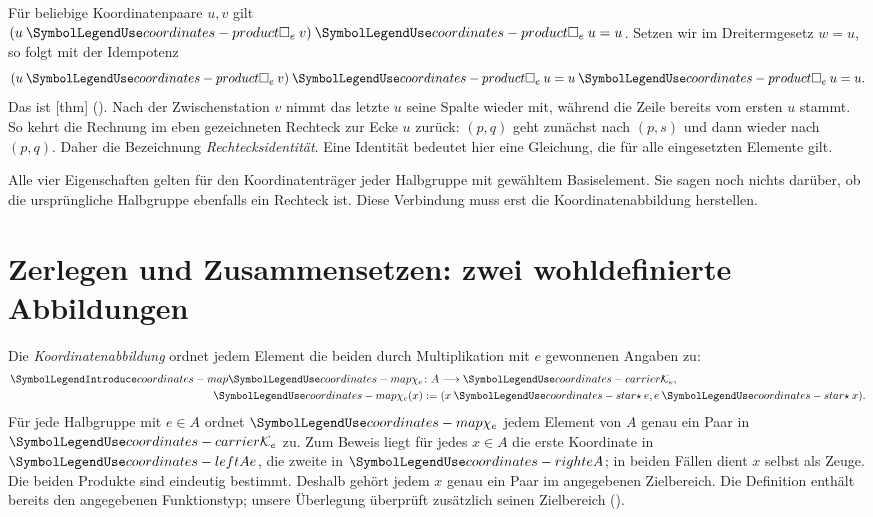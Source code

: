 Für beliebige Koordinatenpaare \(u,v\) gilt
\((u\CRSquare v)\CRSquare u=u\).
Setzen wir im Dreitermgesetz \(w=u\), so folgt mit der Idempotenz
\[
  (u\CRSquare v)\CRSquare u=u\CRSquare u=u.
\]
Das ist [thm]
().
Nach der Zwischenstation \(v\) nimmt das letzte \(u\) seine Spalte
wieder mit, während die Zeile bereits vom ersten \(u\) stammt.
So kehrt die Rechnung im eben gezeichneten Rechteck zur Ecke \(u\)
zurück: \((p,q)\) geht zunächst nach \((p,s)\) und dann wieder
nach \((p,q)\). Daher die Bezeichnung \emph{Rechtecksidentität}.
Eine Identität bedeutet hier eine Gleichung, die für alle eingesetzten
Elemente gilt.

Alle vier Eigenschaften gelten für den Koordinatenträger jeder
Halbgruppe mit gewähltem Basiselement. Sie sagen noch nichts darüber,
ob die ursprüngliche Halbgruppe ebenfalls ein Rechteck ist.
Diese Verbindung muss erst die Koordinatenabbildung herstellen.

\par{}
\section*{Zerlegen und Zusammensetzen: zwei wohldefinierte Abbildungen}
\hypertarget{coordinates.reading.maps}{}

Die \emph{Koordinatenabbildung} ordnet jedem Element die beiden
durch Multiplikation mit \(e\) gewonnenen Angaben zu:
\[
 \begin{aligned}
  \CROrd*{coordinates-map}{\chi_e}&\colon A\longrightarrow\CRK,\\
  \CRChi(x)&:=(x\CRStar e,e\CRStar x).
 \end{aligned}
\]
Für jede Halbgruppe mit \(e\in A\) ordnet \(\CRChi\) jedem
Element von \(A\) genau ein Paar in \(\CRK\) zu.
Zum Beweis liegt für jedes \(x\in A\) die erste Koordinate in \(\CRLeft\),
die zweite in \(\CRRight\); in beiden Fällen dient \(x\) selbst
als Zeuge. Die beiden Produkte sind eindeutig bestimmt. Deshalb
gehört jedem \(x\) genau ein Paar im angegebenen Zielbereich.
Die Definition enthält bereits den angegebenen Funktionstyp;
unsere Überlegung überprüft zusätzlich seinen Zielbereich
().

